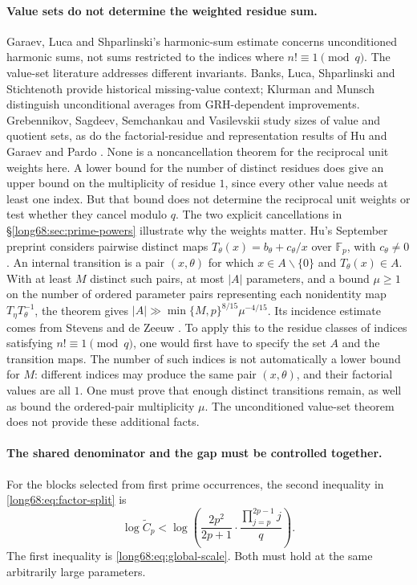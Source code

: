 \documentclass[11pt]{article}
\begin{document}
\paragraph{Value sets do not determine the weighted residue sum.}
Garaev, Luca and Shparlinski's harmonic-sum estimate
\cite[Theorem~1 and (5)]{garaev-luca-shparlinski-harmonic} concerns
unconditioned harmonic sums, not sums restricted to the indices where
$n!\equiv1\pmod q$.
The value-set literature addresses different invariants.  Banks, Luca,
Shparlinski and Stichtenoth \cite{banks-et-al2005} provide historical
missing-value context; Klurman and Munsch
\cite[Theorems~2.1--2.2]{klurman-munsch2017} distinguish unconditional
averages from GRH-dependent improvements.  Grebennikov, Sagdeev,
Semchankau and Vasilevskii
\cite[Corollaries~1.2 and~1.4]{grebennikov-et-al2024} study sizes of value
and quotient sets, as do the factorial-residue and representation results
of Hu \cite{hu2026} and Garaev and Pardo \cite{garaev-pardo2026}.
None is a noncancellation theorem for the reciprocal unit weights here.
A lower bound for the number of distinct residues does give an upper
bound on the multiplicity of residue $1$, since every other value needs
at least one index. But that bound does not determine the reciprocal
unit weights or test whether they cancel modulo
$q$. The two explicit cancellations in \S\ref{long68:sec:prime-powers} illustrate
why the weights matter.
Hu's September preprint \cite[Theorem~3.1]{hu-september2026} considers
pairwise distinct maps $T_\theta(x)=b_\theta+c_\theta/x$ over $\mathbb F_p$,
with $c_\theta\ne0$. An internal transition is a pair $(x,\theta)$ for which
$x\in A\smallsetminus\{0\}$ and $T_\theta(x)\in A$.
With at least $M$ distinct such pairs, at most $|A|$ parameters, and a
bound $\mu\ge1$ on the number of ordered parameter pairs representing each
nonidentity map $T_\eta T_\theta^{-1}$, the theorem gives $|A|\gg\min\{M,p\}^{8/15}\mu^{-4/15}$. Its incidence estimate comes
from Stevens and de Zeeuw \cite[Theorem~4]{stevens-dezeeuw2017}.
To apply this to the residue classes of indices satisfying
$n!\equiv1\pmod q$, one would first have to specify the set $A$ and the
transition maps. The number of such indices is not automatically a
lower bound for $M$: different indices may produce the same pair
$(x,\theta)$, and their factorial values are all $1$. One must prove that
enough distinct transitions remain, as well as bound the ordered-pair
multiplicity $\mu$. The unconditioned value-set theorem does not provide
these additional facts.

\paragraph{The shared denominator and the gap must be controlled together.}
For the blocks selected from first prime occurrences, the second inequality
in \eqref{long68:eq:factor-split} is
\begin{equation}\label{long68:eq:weighted-target}
 \log\widetilde C_p
 <\log\left(\frac{2p^2}{2p+1}\cdot
       \frac{\prod_{j=p}^{2p-1}j}{q}\right).
\end{equation}
The first inequality is \eqref{long68:eq:global-scale}. Both must hold at
the same arbitrarily large parameters.
\end{document}
